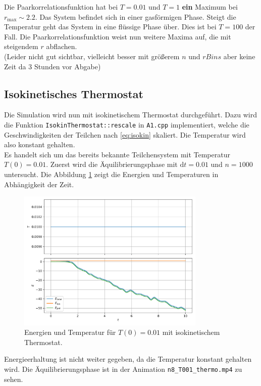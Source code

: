Die Paarkorrelationsfunktion hat bei $T=0.01$ und $T=1$ \textbf{ein} Maximum bei $r_\text{max} \sim 2.2$.
Das System befindet sich in einer gasförmigen Phase.
Steigt die Temperatur geht das System in eine flüssige Phase über.
Dies ist bei $T=100$ der Fall.
Die Paarkorrelationsfunktion weist nun weitere Maxima auf, die mit steigendem $r$ abflachen.
\\
(Leider nicht gut sichtbar, vielleicht besser mit größerem $n$ und $rBins$ aber keine Zeit da 3 Stunden vor Abgabe)

\FloatBarrier

\subsection{Isokinetisches Thermostat}
Die Simulation wird nun mit isokinetischem Thermostat durchgeführt.
Dazu wird die Funktion \texttt{IsokinThermostat::rescale} in \texttt{A1.cpp} implementiert, welche die Geschwindigkeiten der Teilchen nach \autoref{eq:isokin} skaliert.
Die Temperatur wird also konstant gehalten.
\\
Es handelt sich um das bereits bekannte Teilchensystem mit Temperatur $T(0)=0.01$.
Zuerst wird die Äquilibrierungsphase mit $\mathrm{d}t=0.01$ und $n=1000$ untersucht.
Die Abbildung \ref{fig:obs_001_iso} zeigt die Energien und Temperaturen in Abhängigkeit der Zeit.
\begin{figure}
    \centering
    \includegraphics[width=0.8\textwidth]{content/plots/obs_d)_T001_thermo.pdf}
    \caption{Energien und Temperatur für $T(0)=0.01$ mit isokinetischem Thermostat.}
    \label{fig:obs_001_iso}
\end{figure}
Energieerhaltung ist nicht weiter gegeben, da die Temperatur konstant gehalten wird.
Die Äquilibrierungsphase ist in der Animation \texttt{n8\_T001\_thermo.mp4} zu sehen.
